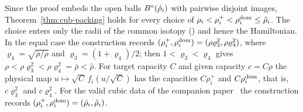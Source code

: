 \begin{remark}\label{rem:rtc-recorded}
Since the proof embeds the open balls $B^{\circ}(\hat\rho_i)$ with pairwise disjoint images, Theorem~\ref{thm:cub-packing}
holds for every choice of $\rho_i<\rho_i^+<\rho_i^{\rm dom}\le\hat\rho_i$. The choice enters only the radii of the common
isotopy () and hence the Hamiltonian. In the equal case the construction records
$(\rho_i^+,\rho_i^{\rm dom})=(\rho \varrho_3^2,\rho \varrho_4^2)$, where $\varrho_4=\sqrt{\bar\rho/\rho}$ and $\varrho_3=(1+\varrho_4)/2$; then
$1<\varrho_3<\varrho_4$ gives $\rho<\rho \varrho_3^2<\rho \varrho_4^2=\bar\rho<\hat\rho$. For target capacity $C$ and given capacity $c=C\rho$
the physical map $u\mapsto\sqrt C\,f_i(u/\sqrt C)$ has the capacities $C\rho_i^+$ and $C\rho_i^{\rm dom}$, that is,
$c\varrho_3^2$ and $c\varrho_4^2$. For the valid cubic data of the companion paper~\cite{SongHD} the construction records
$(\rho_i^+,\rho_i^{\rm dom})=(\bar\rho_i,\hat\rho_i)$.
\end{remark}

